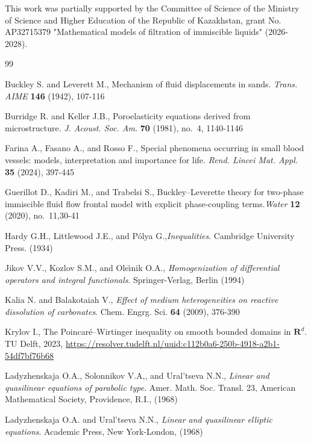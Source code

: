 \documentclass{article}
\theoremstyle{plain}
\theoremstyle{definition}
\numberwithin{equation}{section}
\begin{document}
\begin{funding}
This work was partially supported by the Committee of Science of the Ministry of Science and Higher Education of the Republic of Kazakhstan, grant No. AP32715379 "Mathematical models of filtration of immiscible liquids" (2026-2028).
\end{funding}

\begin{thebibliography}{99}

Buckley S. and Leverett M.,
Mechanism of fluid displacements in sands. \emph{Trans. AIME} \textbf{146} (1942), 107-116

Burridge R. and Keller J.B., Poroelasticity equations derived from microstructure.
\emph{J. Acoust. Soc. Am.} \textbf{70} (1981), no.~4, 1140-1146

Farina A., Fasano A., and Rosso F.,
Special phenomena occurring in small blood vessels: models, interpretation
and importance for life. \emph{Rend. Lincei Mat. Appl.} \textbf{35} (2024), 397-445 

Guerillot D., Kadiri M., and Trabelsi S.,
Buckley--Leverette theory for two-phase immiscible fluid flow frontal
model with explicit phase-coupling terms.\emph{Water} \textbf{12} (2020), no.~11,30-41 

Hardy G.H., Littlewood J.E., and P\'olya G.,\emph{Inequalities}. Cambridge University Press. (1934)
 
Jikov V.V., Kozlov S.M., and Ole{\u\i}nik O.A.,
\emph{Homogenization of differential operators and integral functionals}. Springer-Verlag, Berlin (1994)

Kalia N. and Balakotaiah V.,
\emph{Effect of medium heterogeneities on reactive dissolution of carbonates}.
Chem. Engrg. Sci. \textbf{64} (2009), 376-390

Krylov I.,
The Poincar\'e--Wirtinger inequality on smooth bounded domains in $\mathbf{R}^{d}$.
TU Delft, 2023,
\url{https://resolver.tudelft.nl/uuid:c112b0a6-250b-4918-a2b1-54df7bf76b68}

Ladyzhenskaja O.A., Solonnikov V.A,, and Ural'tseva N.N.,
\emph{Linear and quasilinear equations of parabolic type}.
Amer. Math. Soc. Transl. 23, American Mathematical Society, Providence, R.I., (1968)

Ladyzhenskaja O.A. and Ural'tseva N.N., \emph{Linear and quasilinear elliptic equations}.
Academic Press, New York-London, (1968)


\end{thebibliography}
\end{document}
